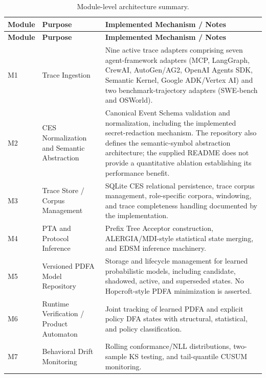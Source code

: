 \documentclass[11pt,a4paper]{article}
\begin{document}
\begin{longtable}{L{1.7cm} L{4.6cm} L{8.1cm}}
\caption{Module-level architecture summary.}
\label{tab:modules}\\
\toprule
\textbf{Module} & \textbf{Purpose} & \textbf{Implemented Mechanism / Notes} \\
\midrule
\endfirsthead

\toprule
\textbf{Module} & \textbf{Purpose} & \textbf{Implemented Mechanism / Notes} \\
\midrule
\endhead

\bottomrule
\endfoot

\bottomrule
\endlastfoot

M1 &
Trace Ingestion &
Nine active trace adapters comprising seven agent-framework adapters
(MCP, LangGraph, CrewAI, AutoGen/AG2, OpenAI Agents SDK, Semantic Kernel,
Google ADK/Vertex AI) and two benchmark-trajectory adapters (SWE-bench and OSWorld).
\\

M2 &
CES Normalization and Semantic Abstraction &
Canonical Event Schema validation and normalization, including the implemented
secret-redaction mechanism. The repository also defines the semantic-symbol abstraction
architecture; the supplied README does not provide a quantitative ablation establishing
its performance benefit. \\

M3 &
Trace Store / Corpus Management &
SQLite CES relational persistence, trace corpus management, role-specific corpora,
windowing, and trace completeness handling documented by the implementation. \\

M4 &
PTA and Protocol Inference &
Prefix Tree Acceptor construction, ALERGIA/MDI-style statistical state merging,
and EDSM inference machinery. \\

M5 &
Versioned PDFA Model Repository &
Storage and lifecycle management for learned probabilistic models, including
candidate, shadowed, active, and superseded states. No Hopcroft-style PDFA minimization
is asserted. \\

M6 &
Runtime Verification / Product Automaton &
Joint tracking of learned PDFA and explicit policy DFA states with structural,
statistical, and policy classification. \\

M7 &
Behavioral Drift Monitoring &
Rolling conformance/NLL distributions, two-sample KS testing, and tail-quantile
CUSUM monitoring. \\


\end{longtable}
\end{document}
